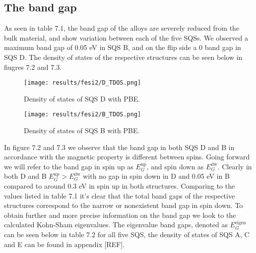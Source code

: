\newpage
\subsection{The band gap}
As seen in table 7.1, the band gap of the alloys are severely reduced from the bulk material, and show variation between each of the five SQSs. We observed a maximum band gap of 0.05 eV in SQS B, and on the flip side a 0 band gap in SQS D. The density of states of the respective structures can be seen below in fiugres 7.2 and 7.3.  

\begin{figure}[H]
	\centering
	\texttt{[image: results/fesi2/D\_TDOS.png]}
	\caption{Density of states of SQS D  with PBE.}
\end{figure}

\begin{figure}[H]
\centering
	\texttt{[image: results/fesi2/B\_TDOS.png]}
	\caption{Density of states of SQS B  with PBE.}
\end{figure}  

In figure 7.2  and 7.3 we observe that the band gap in both SQS D and B in accordance with the magnetic property is different between spins. Going forward we will refer to the band gap in spin up as $E_G ^\text{up}$, and spin down as $E_G ^\text{dw}$. Clearly in both D and B $E_G ^\text{up} > E_G ^\text{dw}$ with no gap in spin down in D and 0.05 eV in B compared to around 0.3 eV in spin up in both structures. Comparing to the values listed in table 7.1 it's clear that the total band gaps of the respective structures correspond to the narrow or nonexistent band gap in spin down. To obtain further and more precise information on the band gap we look to the calculated Kohn-Sham eigenvalues. The eigenvalue band gaps, denoted as $E_G ^\text{eigen}$ can be seen below in table 7.2 for all five SQS, the density of states of SQS A, C and E can be found in appendix [REF].  

